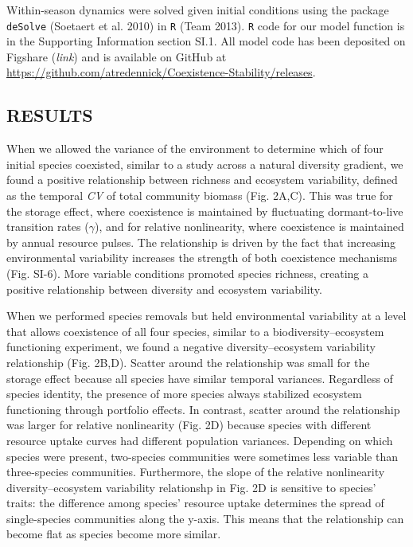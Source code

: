 \documentclass[12pt,]{article}
\begin{document}
Within-season dynamics were solved given initial conditions using the
package \texttt{deSolve} (Soetaert et al. 2010) in \texttt{R} (Team
2013). \texttt{R} code for our model function is in the Supporting
Information section SI.1. All model code has been deposited on Figshare
(\emph{link}) and is available on GitHub at
\url{https://github.com/atredennick/Coexistence-Stability/releases}.

\subsection{RESULTS}\label{results}

When we allowed the variance of the environment to determine which of
four initial species coexisted, similar to a study across a natural
diversity gradient, we found a positive relationship between richness
and ecosystem variability, defined as the temporal \emph{CV} of total
community biomass (Fig. 2A,C). This was true for the storage effect,
where coexistence is maintained by fluctuating dormant-to-live
transition rates (\(\gamma\)), and for relative nonlinearity, where
coexistence is maintained by annual resource pulses. The relationship is
driven by the fact that increasing environmental variability increases
the strength of both coexistence mechanisms (Fig. SI-6). More variable
conditions promoted species richness, creating a positive relationship
between diversity and ecosystem variability.

When we performed species removals but held environmental variability at
a level that allows coexistence of all four species, similar to a
biodiversity--ecosystem functioning experiment, we found a negative
diversity--ecosystem variability relationship (Fig. 2B,D). Scatter
around the relationship was small for the storage effect because all
species have similar temporal variances. Regardless of species identity,
the presence of more species always stabilized ecosystem functioning
through portfolio effects. In contrast, scatter around the relationship
was larger for relative nonlinearity (Fig. 2D) because species with
different resource uptake curves had different population variances.
Depending on which species were present, two-species communities were
sometimes less variable than three-species communities. Furthermore, the
slope of the relative nonlinearity diversity--ecosystem variability
relationshp in Fig. 2D is sensitive to species' traits: the difference
among species' resource uptake determines the spread of single-species
communities along the y-axis. This means that the relationship can
become flat as species become more similar.
\end{document}
